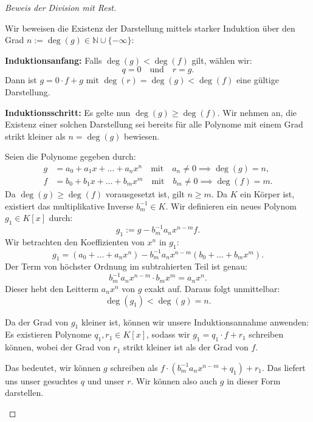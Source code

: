 \begin{proof}[Beweis der Division mit Rest]
\begin{math-stroke}[Existenzbeweis]
Wir beweisen die Existenz der Darstellung mittels starker Induktion über den Grad $n := \deg(g) \in \mathbb{N} \cup \{-\infty\}$:

\textbf{Induktionsanfang:}
Falls $\deg(g) < \deg(f)$ gilt, wählen wir:
\[
q = 0 \quad \text{und} \quad r = g.
\]
Dann ist $g = 0 \cdot f + g$ mit $\deg(r) = \deg(g) < \deg(f)$ eine gültige Darstellung.

\textbf{Induktionsschritt:}
Es gelte nun $\deg(g) \ge \deg(f)$. Wir nehmen an, die Existenz einer solchen Darstellung sei bereits für alle Polynome mit einem Grad strikt kleiner als $n = \deg(g)$ bewiesen.

Seien die Polynome gegeben durch:
\begin{align*}
g &= a_0 + a_1 x + \dots + a_n x^n \quad \text{mit} \quad a_n \neq 0 \implies \deg(g) = n, \\
f &= b_0 + b_1 x + \dots + b_m x^m \quad \text{mit} \quad b_m \neq 0 \implies \deg(f) = m.
\end{align*}
Da $\deg(g) \ge \deg(f)$ vorausgesetzt ist, gilt $n \ge m$. Da $K$ ein Körper ist, existiert das multiplikative Inverse $b_m^{-1} \in K$. Wir definieren ein neues Polynom $g_1 \in K[x]$ durch:
\begin{equation}\label{eq:g1-definition}
g_1 := g - b_m^{-1} a_n x^{n-m} f.
\end{equation}
Wir betrachten den Koeffizienten von $x^n$ in $g_1$:
\[
g_1 = \left( a_0 + \dots + a_n x^n \right) - b_m^{-1} a_n x^{n-m} \left( b_0 + \dots + b_m x^m \right).
\]
Der Term von höchster Ordnung im subtrahierten Teil ist genau:
\[
b_m^{-1} a_n x^{n-m} \cdot b_m x^m = a_n x^n.
\]
Dieser hebt den Leitterm $a_n x^n$ von $g$ exakt auf. Daraus folgt unmittelbar:
\[
\deg(g_1) < \deg(g) = n.
\]
\end{math-stroke}

\begin{spoken-clean}[00:28:00 - 00:28:47]
Da der Grad von $g_1$ kleiner ist, können wir unsere Induktionsannahme anwenden: Es existieren Polynome $q_1, r_1 \in K[x]$, sodass wir $g_1 = q_1 \cdot f + r_1$ schreiben können, wobei der Grad von $r_1$ strikt kleiner ist als der Grad von $f$.

Das bedeutet, wir können $g$ schreiben als $f \cdot (b_m^{-1} a_n x^{n-m} + q_1) + r_1$. Das liefert uns unser gesuchtes $q$ und unser $r$. Wir können also auch $g$ in dieser Form darstellen.


\end{spoken-clean}
\end{proof}

